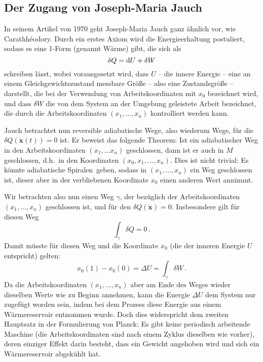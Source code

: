 \subsection{Der Zugang von Joseph-Maria Jauch}

In seinem Artikel von 1970 \cite{Jauch} geht Joseph-Maria Jauch ganz \"ahnlich vor, wie 
Carathh\'{e}odory. Durch ein erstes Axiom wird die Energieerhaltung postuliert, sodass es
eine 1-Form (genannt W\"arme) gibt, die sich als
\begin{equation}
                 \delta Q ={\rm d}U + \delta W 
\end{equation}
schreiben l\"asst, wobei vorausgesetzt wird, dass $U$ -- die innere Energie -- eine an einem
Gleichgewichtszustand messbare Gr\"o\ss e -- also eine Zustandsgr\"o\ss e -- darstellt, 
die bei der Verwendung von Arbeitskoordinaten mit $x_0$ bezeichnet wird,
und dass $\delta W$ die von dem System an der Umgebung geleistete Arbeit bezeichnet, die
durch die Arbeitskoordinaten $(x_1,...,x_n)$ kontrolliert werden kann. 

Jauch betrachtet nun reversible adiabatische Wege, also wiederum Wege, f\"ur die
$\delta Q(\dot{\pmb{x}}(t))=0$ ist. Er beweist das folgende Theorem: Ist ein adiabatischer Weg
in den Arbeitskoordinaten $(x_1,...x_n)$ geschlossen, dann ist er auch in $M$ geschlossen, d.h.\
in den Koordinaten $(x_0,x_1,...,x_n)$. Dies ist nicht trivial: Es k\"onnte adiabatische \glqq Spiralen\grqq\ 
geben, sodass in $(x_1,...,x_n)$ ein Weg geschlossen ist, dieser aber in der verbliebenen Koordinate
$x_0$ einen anderen Wert annimmt. 

Wir betrachten also nun einen Weg $\gamma$, der bez\"uglich der Arbeitskoordinaten $(x_1,...,x_n)$
geschlossen ist, und f\"ur den $\delta Q(\dot{\pmb{x}})=0$. Insbesondere gilt f\"ur diesen Weg
\begin{equation}
      \int_{\gamma} \delta Q = 0 \, .
\end{equation}      
Damit m\"usste f\"ur diesen Weg und die Koordinate $x_0$ (die der inneren Energie $U$ entspricht) 
gelten:      
\begin{equation}      
               x_0(1) - x_0(0) =  \Delta U  =  \int_{\gamma} \delta W \, .
\end{equation}
Da die Arbeitskoordinaten $(x_1,...,x_n)$ aber am Ende des Weges wieder dieselben Werte wie
zu Beginn annehmen, kann die Energie $\Delta U$ dem System nur zugef\"ugt worden sein, indem
bei dem Prozess diese Energie aus einem W\"armereservoir entnommen wurde. Doch dies widerspricht
dem zweiten Hauptsatz in der Formulierung von Planck: Es gibt keine periodisch arbeitende Maschine
(die Arbeitskoordinaten sind nach einem Zyklus dieselben wie vorher), deren einziger Effekt darin besteht, 
dass ein Gewicht angehoben wird und sich ein W\"armereservoir abgek\"uhlt hat.


